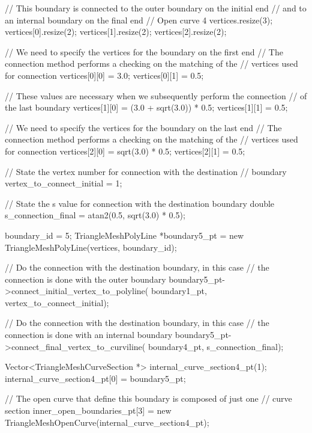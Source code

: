  
\begin{DoxyCodeInclude}
  \textcolor{comment}{// This boundary is connected to the outer boundary on the initial end}
  \textcolor{comment}{// and to an internal boundary on the final end}
  \textcolor{comment}{// Open curve 4}
  vertices.resize(3);
  vertices[0].resize(2);
  vertices[1].resize(2);
  vertices[2].resize(2);

  \textcolor{comment}{// We need to specify the vertices for the boundary on the first end}
  \textcolor{comment}{// The connection method performs a checking on the matching of the}
  \textcolor{comment}{// vertices used for connection}
  vertices[0][0] = 3.0;
  vertices[0][1] = 0.5;

  \textcolor{comment}{// These values are necessary when we subsequently perform the connection}
  \textcolor{comment}{// of the last boundary}
  vertices[1][0] = (3.0 + sqrt(3.0)) * 0.5;
  vertices[1][1] = 0.5;

  \textcolor{comment}{// We need to specify the vertices for the boundary on the last end}
  \textcolor{comment}{// The connection method performs a checking on the matching of the}
  \textcolor{comment}{// vertices used for connection}
  vertices[2][0] = sqrt(3.0) * 0.5;
  vertices[2][1] = 0.5;

  \textcolor{comment}{// State the vertex number for connection with the destination}
  \textcolor{comment}{// boundary}
  vertex\_to\_connect\_initial = 1;

  \textcolor{comment}{// State the s value for connection with the destination boundary}
  \textcolor{keywordtype}{double} s\_connection\_final = atan2(0.5, sqrt(3.0) * 0.5);

  boundary\_id = 5;
  TriangleMeshPolyLine *boundary5\_pt =
    \textcolor{keyword}{new} TriangleMeshPolyLine(vertices, boundary\_id);

  \textcolor{comment}{// Do the connection with the destination boundary, in this case}
  \textcolor{comment}{// the connection is done with the outer boundary}
  boundary5\_pt->connect\_initial\_vertex\_to\_polyline(
                                boundary1\_pt,
                                vertex\_to\_connect\_initial);

  \textcolor{comment}{// Do the connection with the destination boundary, in this case}
  \textcolor{comment}{// the connection is done with an internal boundary}
  boundary5\_pt->connect\_final\_vertex\_to\_curviline(
                                boundary4\_pt,
                                s\_connection\_final);

  Vector<TriangleMeshCurveSection *> internal\_curve\_section4\_pt(1);
  internal\_curve\_section4\_pt[0] = boundary5\_pt;

  \textcolor{comment}{// The open curve that define this boundary is composed of just one}
  \textcolor{comment}{// curve section}
  inner\_open\_boundaries\_pt[3] =
      \textcolor{keyword}{new} TriangleMeshOpenCurve(internal\_curve\_section4\_pt);

\end{DoxyCodeInclude}


